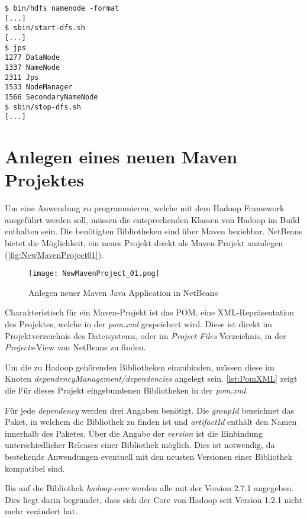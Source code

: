 \begin{lstlisting}[caption=Test der Konfiguration, label=lis:TestenDerKonf]
$ bin/hdfs namenode -format
[...]
$ sbin/start-dfs.sh
[...]
$ jps
1277 DataNode
1337 NameNode
2311 Jps
1533 NodeManager
1566 SecondaryNameNode
$ sbin/stop-dfs.sh
[...]
\end{lstlisting}


\section{Anlegen eines neuen Maven Projektes}
Um eine Anwendung zu programmieren, welche mit dem Hadoop Framework ausgeführt werden soll, müssen die entsprechenden Klassen von Hadoop im Build enthalten sein. Die benötigten Bibliotheken sind über \gls{Maven} beziehbar. \gls{NetBeans} bietet die Möglichkeit, ein neues Projekt direkt als \gls{Maven}-Projekt anzulegen (\autoref{fig:NewMavenProject01}).

\begin{figure}[h]
	\texttt{[image: NewMavenProject\_01.png]}
	\caption{Anlegen neuer Maven Java Application in NetBeans}
	\label{fig:NewMavenProject01}
\end{figure}

Charakteristisch für ein \gls{Maven}-Projekt ist das \ac{POM}, eine XML-Repräsentation des Projektes, welche in der \textit{pom.xml} gespeichert wird. Diese ist direkt im Projektverzeichnis des Dateisystems, oder im \textit{Project Files} Verzeichnis, in der \textit{Projects}-View von \gls{NetBeans} zu finden.

Um die zu Hadoop gehörenden Bibliotheken einzubinden, müssen diese im Knoten \textit{dependencyManagement/dependencies} angelegt sein. \autoref{lst:PomXML} zeigt die Für dieses Projekt eingebundenen Bibliotheken in der \textit{pom.xml}.

Für jede \textit{dependency} werden drei Angaben benötigt. Die \textit{groupId} bezeichnet das Paket, in welchem die Bibliothek zu finden ist und \textit{artifactId} enthält den Namen innerhalb des Paketes. Über die Angabe der \textit{version} ist die Einbindung unterschiedlicher Releases einer Bibliothek möglich. Dies ist notwendig, da bestehende Anwendungen eventuell  mit den neusten Versionen einer Bibliothek kompatibel sind.

Bis auf die Bibliothek \textit{hadoop-core} werden alle mit der Version 2.7.1 angegeben. Dies liegt darin begründet, dass sich der Core von Hadoop seit Version 1.2.1 nicht mehr verändert hat. \\

